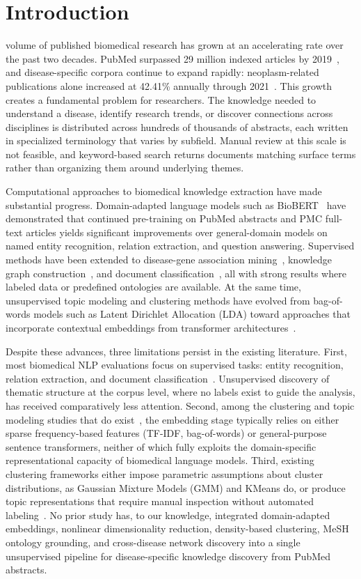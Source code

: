 \documentclass[a4paper,10pt,conference]{IEEEtran}
\begin{document}
\section{Introduction}

 volume of published biomedical research has grown at an accelerating rate over the past two decades. PubMed surpassed 29 million indexed articles by 2019~\cite{ref1}, and disease-specific corpora continue to expand rapidly: neoplasm-related publications alone increased at 42.41\% annually through 2021~\cite{ref13}. This growth creates a fundamental problem for researchers. The knowledge needed to understand a disease, identify research trends, or discover connections across disciplines is distributed across hundreds of thousands of abstracts, each written in specialized terminology that varies by subfield. Manual review at this scale is not feasible, and keyword-based search returns documents matching surface terms rather than organizing them around underlying themes.

Computational approaches to biomedical knowledge extraction have made substantial progress. Domain-adapted language models such as BioBERT~\cite{ref1} have demonstrated that continued pre-training on PubMed abstracts and PMC full-text articles yields significant improvements over general-domain models on named entity recognition, relation extraction, and question answering. Supervised methods have been extended to disease-gene association mining~\cite{ref8,ref10}, knowledge graph construction~\cite{ref9}, and document classification~\cite{ref13}, all with strong results where labeled data or predefined ontologies are available. At the same time, unsupervised topic modeling and clustering methods have evolved from bag-of-words models such as Latent Dirichlet Allocation (LDA) toward approaches that incorporate contextual embeddings from transformer architectures~\cite{ref15,ref17}.

Despite these advances, three limitations persist in the existing literature. First, most biomedical NLP evaluations focus on supervised tasks: entity recognition, relation extraction, and document classification~\cite{ref2,ref3,ref4,ref5,ref6}. Unsupervised discovery of thematic structure at the corpus level, where no labels exist to guide the analysis, has received comparatively less attention. Second, among the clustering and topic modeling studies that do exist~\cite{ref15,ref16,ref17}, the embedding stage typically relies on either sparse frequency-based features (TF-IDF, bag-of-words) or general-purpose sentence transformers, neither of which fully exploits the domain-specific representational capacity of biomedical language models. Third, existing clustering frameworks either impose parametric assumptions about cluster distributions, as Gaussian Mixture Models (GMM) and KMeans do, or produce topic representations that require manual inspection without automated labeling~\cite{ref17}. No prior study has, to our knowledge, integrated domain-adapted embeddings, nonlinear dimensionality reduction, density-based clustering, MeSH ontology grounding, and cross-disease network discovery into a single unsupervised pipeline for disease-specific knowledge discovery from PubMed abstracts.
\end{document}
